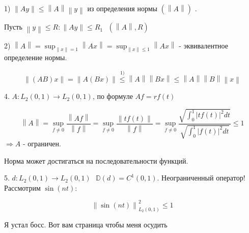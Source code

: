 \documentclass[12pt, a4paper]{report}
\begin{document}
1) \( \left\lVert A y  \right\rVert \le \left\lVert A  \right\rVert \left\lVert  y \right\rVert \) из определения нормы \( (\left\lVert A \right\rVert) \) .
    
Пусть \( \left\lVert  y  \right\rVert \le R : \left\lVert  A y  \right\rVert \le R_1 \text{ } (\left\lVert A  \right\rVert , R)  \)

2) \( \left\lVert  A  \right\rVert = \sup _{\left\lVert x  \right\rVert =1 } \left\lVert A x  \right\rVert  = \sup _{\left\lVert  x  \right\rVert \le 1 } \left\lVert A x  \right\rVert   \) - эквивалентное определение нормы. 

\[ \left\lVert  (AB )x  \right\rVert  = \left\lVert  A (B x ) \right\rVert\overset{1)}{ \le}  \left\lVert  A  \right\rVert \left\lVert B x  \right\rVert \le \left\lVert  A  \right\rVert \left\lVert  B \right\rVert \left\lVert x  \right\rVert \] 

4. \( A : L_2 (0,1 ) \to  L_2 (0,1 )  \), по формуле \( A f = r f (t ) \) 

\[ \left\lVert  A  \right\rVert = \sup _{f\neq 0} \frac{ \left\lVert  A f  \right\rVert}{\left\lVert f  \right\rVert} = \sup _{f \neq 0 } \frac{ \left\lVert  t f(t) \right\rVert}{\left\lVert  f  \right\rVert}    = \sup _{f \neq 0} \frac{\displaystyle  \sqrt{\int_{0 }^{1 }  \left\lvert  t f (t ) \right\rvert ^2 dt }}{\displaystyle  \sqrt{\int_{0 }^{1 }  \left\lvert f(t ) \right\rvert ^2 dt }} \le 1 \] 
\( \Rightarrow  A  \)  - ограничен.

Норма может достигаться на последовательности функций. 

5. \( d : L_2(0,1 ) \to  L_2 (0,1 ) \text{ }  \mathbb{D} (d ) = C^1 (0,1 )\). Неограниченный оператор! \\

Рассмотрим \( \sin  (nt ) \): 

\[ \left\lVert  \sin (n t ) \right\rVert _{L_2 (0,1 )} ^2 \le 1  \] 

\newpage

Я устал босс. Вот вам страница чтобы меня осудить

\ifdefined\mainfile
\else
    
\end{document}
